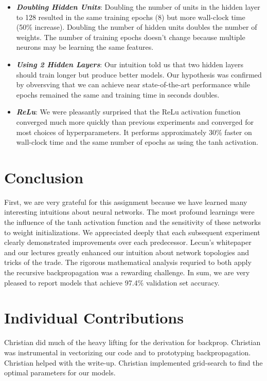 \documentclass{article} %
\begin{document}
{{\begin{itemize}
\item \textbf{\textit{Doubling Hidden Units}}: Doubling the number of units in the hidden layer to 128 resulted in the same training epochs (8) but more wall-clock time (50\% increase).  Doubling the number of hidden units doubles the number of weights.  The number of training epochs doesn't change because multiple neurons may be learning the same features.  
\item \textbf{\textit{Using 2 Hidden Layers}}: Our intuition told us that two hidden layers should train longer but produce better models.  Our hypothesis was confirmed by obversving that we can achieve near state-of-the-art performance while epochs remained the same and training time in seconds doubles.
\item \textbf{\textit{ReLu}}: We were pleasantly surprised that the ReLu activation function converged much more quickly than previous experiments and converged for most choices of hyperparameters. It performs approximately 30\% faster on wall-clock time and the same number of epochs as using the tanh activation.  
\end{itemize}

\section*{Conclusion}

First, we are very grateful for this assignment because we have learned many interesting intuitions about neural networks.  The most profound learnings were the influence of the tanh activation function and the sensitivity of these networks to weight initializations.  We appreciated deeply that each subsequent experiment clearly demonstrated improvements over each predecessor.  Lecun's whitepaper and our lectures greatly enhanced our intuition about network topologies and tricks of the trade.  The rigorous mathematical analysis requried to both apply the recursive backpropagation was a rewarding challenge.  In sum, we are very pleased to report models that achieve 97.4\% validation set accuracy.  


\section*{Individual Contributions}

Christian did much of the heavy lifting for the derivation for backprop.  Christian was instrumental in vectorizing our code and to prototyping backpropagation.  Christian helped with the write-up.  Christian implemented grid-search to find the optimal parameters for our models.  

}}
\end{document}
